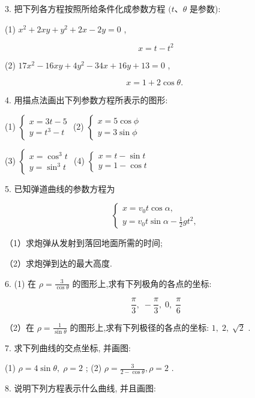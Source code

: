 \documentclass[lang=cn,newtx,10pt,scheme=chinese]{elegantbook}
\begin{document}
3. 把下列各方程按照所给条件化成参数方程 \((t\text{、}\theta\) 是参数):

(1) \({x}^{2} + {2xy} + {y}^{2} + {2x} - {2y} = 0\) ,

\[
  x = t - {t}^{2}
\]

(2) \({17}{x}^{2} - {16xy} + 4{y}^{2} - {34x} + {16y} + {13} = 0\) ,

\[
  x = 1 + 2\cos \theta \text{. }
\]

4. 用描点法画出下列参数方程所表示的图形:

(1) \(\left\{ \begin{array}{l} x = {3t} - 5 \\ y = {t}^{3} - t \end{array}\right.\) (2) \(\left\{ \begin{array}{l} x = 5\cos \phi \\ y = 3\sin \phi \end{array}\right.\)

(3) \(\left\{ \begin{array}{l} x = {\cos }^{3}t \\ y = {\sin }^{3}t \end{array}\right.\) (4) \(\left\{ \begin{array}{l} x = t - \sin t \\ y = 1 - \cos t \end{array}\right.\)

5. 已知弹道曲线的参数方程为

\[
  \left\{ \begin{array}{l} x = {v}_{0}t\cos \alpha , \\ y = {v}_{0}t\sin \alpha - \frac{1}{2}g{t}^{2}, \end{array}\right.
\]

（1）求炮弹从发射到落回地面所需的时间;

（2）求炮弹到达的最大高度.

6. (1) 在 \(\rho = \frac{3}{\cos \theta }\) 的图形上,求有下列极角的各点的坐标:

\[
  \frac{\pi }{3},\; - \frac{\pi }{3},\;0,\;\frac{\pi }{6}
\]

（2）在 \(\rho = \frac{1}{\sin \theta }\) 的图形上,求有下列极径的各点的坐标: \(1,\;2,\;\sqrt{2}\) .

7. 求下列曲线的交点坐标, 并画图:

(1) \(\rho = 4\sin \theta ,\;\rho = 2\) ; (2) \(\rho = \frac{3}{2 - \cos \theta },\rho = 2\) .

8. 说明下列方程表示什么曲线, 并且画图:
\end{document}
